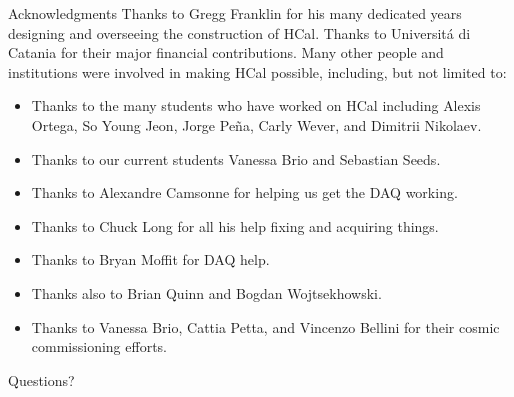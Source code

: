 \documentclass[10pt]{beamer}
\begin{document}
\begin{frame}{Acknowledgments}
Thanks to \alert{Gregg Franklin} for his many dedicated years designing and overseeing the construction of HCal. Thanks to \alert{Universit\'{a} di Catania} for their major financial contributions. Many other people and institutions were involved in making HCal possible, including, but not limited to:
    \begin{itemize}
        \item Thanks to the many students who have worked on HCal including \alert{Alexis Ortega}, \alert{So Young Jeon}, \alert{Jorge Pe\~{n}a}, \alert{Carly Wever}, and  \alert{Dimitrii Nikolaev}. 
        \item Thanks to our current students \alert{Vanessa Brio} and \alert{Sebastian Seeds}.
        \item Thanks to \alert{Alexandre Camsonne} for helping us get the DAQ working.
        \item Thanks to \alert{Chuck Long} for all his help fixing and acquiring things.
        \item Thanks to \alert{Bryan Moffit} for DAQ help.
        \item Thanks also to \alert{Brian Quinn} and \alert{Bogdan Wojtsekhowski}.
        \item Thanks to \alert{Vanessa Brio}, \alert{Cattia Petta}, and \alert{Vincenzo Bellini} for their cosmic commissioning efforts.%
    \end{itemize}

\end{frame}

\begin{frame}{Questions?}%
	
	\renewcommand*{\bibfont}{\scriptsize}%
	\printbibliography
	
\end{frame}
\end{document}
